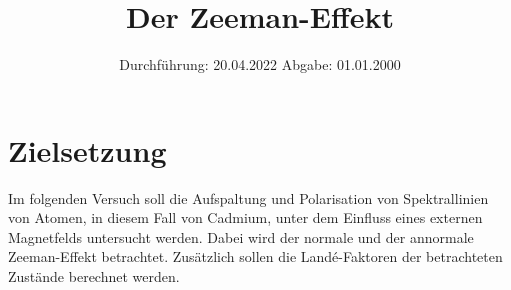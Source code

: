 


\subject{V27}
\title{Der Zeeman-Effekt}
\date{
    Durchführung: 20.04.2022
     \hspace{3em}
    Abgabe: 01.01.2000
}


\maketitle
\thispagestyle{empty}
\tableofcontents
\newpage

\section{Zielsetzung}

    Im folgenden Versuch soll die Aufspaltung und Polarisation von Spektrallinien von Atomen,
    in diesem Fall von Cadmium,
    unter dem Einfluss eines externen Magnetfelds untersucht werden.
    Dabei wird der normale und der annormale Zeeman-Effekt betrachtet.
    Zusätzlich sollen die Landé-Faktoren der betrachteten Zustände berechnet werden.


\clearpage


\clearpage


\clearpage


\clearpage

\printbibliography


